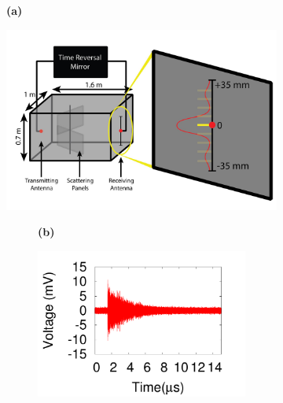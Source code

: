 \documentclass[conference]{IEEEtran}
\begin{document}
\begin{figure}[]
	\centering
	\begin{subfigure}[t]{0.03\columnwidth}
	\textbf{(a)}
	\end{subfigure}
	\begin{subfigure}[t]{0.9\columnwidth}
		\includegraphics[width=\columnwidth,valign=t]{figs/gigabox.jpg}
		\caption{\label{fig:gigabox}}
	\end{subfigure}
	\begin{subfigure}[]{0.9\columnwidth}
		\vspace{-1.5\baselineskip}
	\begin{subfigure}[t]{0.03\columnwidth}
	\textbf{(b)}
	\end{subfigure}
		\begin{subfigure}[t]{0.45\columnwidth}
				\centering
				\includegraphics[width=\columnwidth,valign=t]{figs/sona.pdf}

\end{subfigure}
\end{subfigure}
\end{figure}
\end{document}
